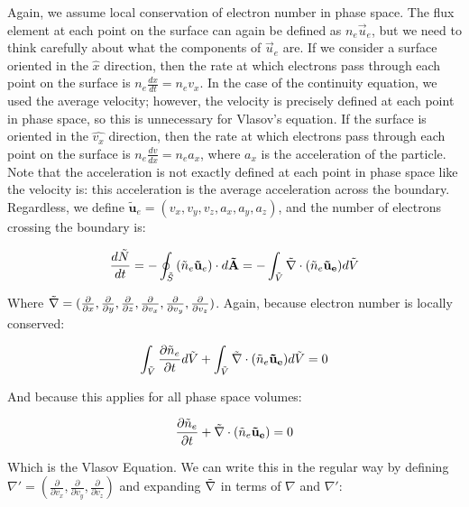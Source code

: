 \documentclass[11pt]{article}
\begin{document}
Again, we assume local conservation of electron number in phase space. The flux element at each point on the surface can again be defined as $n_e\vec{u}_e$, but we need to think carefully about what the components of $\vec{u}_e$ are. If we consider a surface oriented in the $\hat{x}$ direction, then the rate at which electrons pass through each point on the surface is $n_e\frac{dx}{dt}=n_ev_x$. In the case of the continuity equation, we used the average velocity; however, the velocity is precisely defined at each point in phase space, so this is unnecessary for Vlasov's equation. If the surface is oriented in the $\hat{v_x}$ direction, then the rate at which electrons pass through each point on the surface is $n_e\frac{dv}{dx}=n_ea_x$, where $a_x$ is the acceleration of the particle. Note that the acceleration is not exactly defined at each point in phase space like the velocity is: this acceleration is the average acceleration across the boundary. Regardless, we define $\mathbf{\tilde{u}}_e=(v_x,v_y,v_z,a_x,a_y,a_z)$, and the number of electrons crossing the boundary is:

\begin{equation}
    \frac{d\Tilde{N}}{dt} = -\oint_{\Tilde{S}}{(\Tilde{n}_e \mathbf{\Tilde{u}}_e) \cdot d \mathbf{\Tilde{A}}} = -\int_{\Tilde{V}} \Tilde{\nabla} \cdot (\tilde{n}_e \mathbf{\Tilde{u}_e}) d\Tilde{V}
\end{equation}

Where $\Tilde{\nabla} = (\frac{\partial}{\partial x},\frac{\partial}{\partial y},\frac{\partial}{\partial z},\frac{\partial}{\partial v_x},\frac{\partial}{\partial v_y},\frac{\partial}{\partial v_z})$. Again, because electron number is locally conserved:

\begin{equation}
    \int_{\Tilde{V}}\frac{\partial \Tilde{n}_e}{\partial t} d\Tilde{V} + \int_{\Tilde{V}} \Tilde{\nabla} \cdot (\tilde{n}_e \mathbf{\Tilde{u}_e}) d\Tilde{V} = 0
\end{equation}

And because this applies for all phase space volumes:

\begin{equation}
    \frac{\partial \Tilde{n}_e}{\partial t} + \Tilde{\nabla} \cdot (\tilde{n}_e \mathbf{\Tilde{u}_e}) = 0
\end{equation}

Which is the Vlasov Equation. We can write this in the regular way by defining $\nabla'=(\frac{\partial}{\partial v_x}, \frac{\partial}{\partial v_y}, \frac{\partial}{\partial v_z})$ and expanding $\Tilde{\nabla}$ in terms of $\nabla$ and $\nabla'$:
\end{document}
